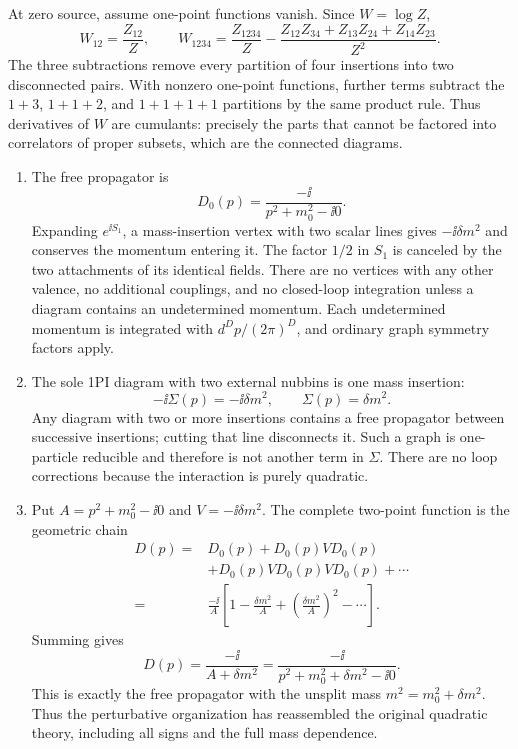 \begin{enumerate}
At zero source, assume one-point functions vanish.  Since \(W=\log Z\),
\[
 W_{12}=\frac{Z_{12}}Z,\qquad
 W_{1234}=\frac{Z_{1234}}Z
 -\frac{Z_{12}Z_{34}+Z_{13}Z_{24}+Z_{14}Z_{23}}{Z^2}.
\]
The three subtractions remove every partition of four insertions into
two disconnected pairs.  With nonzero one-point functions, further
terms subtract the \(1+3\), \(1+1+2\), and \(1+1+1+1\) partitions by the
same product rule.  Thus derivatives of \(W\) are cumulants: precisely
the parts that cannot be factored into correlators of proper subsets,
which are the connected diagrams.

\begin{enumerate}
\item
The free propagator is
\[
 D_0(p)=\frac{-\ii}{p^2+m_0^2-\ii0}.
\]
Expanding \(e^{\ii S_1}\), a mass-insertion vertex with two scalar lines gives
\(-\ii\delta m^2\) and conserves the momentum entering it.  The factor
\(1/2\) in \(S_1\) is canceled by the two attachments of its identical
fields.  There are no vertices with any other valence, no additional
couplings, and no closed-loop integration unless a diagram contains an
undetermined momentum.  Each undetermined momentum is integrated with
\(d^Dp/(2\pi)^D\), and ordinary graph symmetry factors apply.
\item
The sole 1PI diagram with two external nubbins is one mass insertion:
\[
 -\ii\Sigma(p)=-\ii\delta m^2,
 \qquad \Sigma(p)=\delta m^2.
\]
Any diagram with two or more insertions contains a free propagator between
successive insertions; cutting that line disconnects it.  Such a graph is
one-particle reducible and therefore is not another term in \(\Sigma\).
There are no loop corrections because the interaction is purely quadratic.

\item
Put \(A=p^2+m_0^2-\ii0\) and \(V=-\ii\delta m^2\).  The complete two-point
function is the geometric chain
\[
 \begin{split}
 D(p)={}&D_0(p)+D_0(p)VD_0(p)\\
 &+D_0(p)VD_0(p)VD_0(p)+\cdots\\
 ={}&\frac{-\ii}{A}\left[1-\frac{\delta m^2}{A}
 +\left(\frac{\delta m^2}{A}\right)^2-\cdots\right].
 \end{split}
\]
Summing gives
\[
 D(p)=\frac{-\ii}{A+\delta m^2}
 =\frac{-\ii}{p^2+m_0^2+\delta m^2-\ii0}.
\]
This is exactly the free propagator with the unsplit mass
\(m^2=m_0^2+\delta m^2\).  Thus the perturbative organization has
reassembled the original quadratic theory, including all signs and the
full mass dependence.
\end{enumerate}
\end{enumerate}

